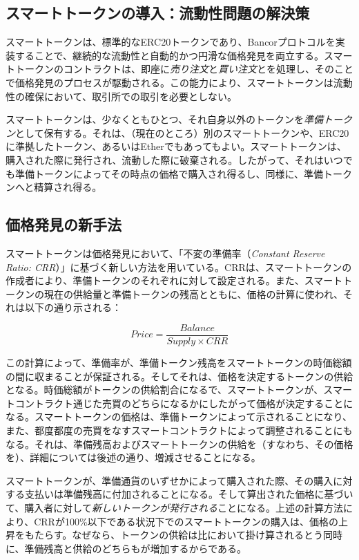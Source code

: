 \documentclass{jsarticle}
\begin{document}
  \subsection{スマートトークンの導入：流動性問題の解決策}

  スマートトークンは、標準的なERC20トークンであり、Bancorプロトコルを実装することで、継続的な流動性と自動的かつ円滑な価格発見を両立する。スマートトークンのコントラクトは、即座に\emph{売り注文}と\emph{買い注文}とを処理し、そのことで価格発見のプロセスが駆動される。この能力により、スマートトークンは流動性の確保において、取引所での取引を必要としない。

  スマートトークンは、少なくともひとつ、それ自身以外のトークンを\emph{準備トークン}として保有する。それは、（現在のところ）別のスマートトークンや、ERC20に準拠したトークン、あるいはEtherでもあってもよい。スマートトークンは、購入された際に発行され、流動した際に破棄される。したがって、それはいつでも準備トークンによってその時点の価格で購入され得るし、同様に、準備トークンへと精算され得る。

  \subsection{価格発見の新手法}

  スマートトークンは価格発見において、「不変の準備率（\textit{Constant Reserve Ratio: CRR}）」に基づく新しい方法を用いている。CRRは、スマートトークンの作成者により、準備トークンのそれぞれに対して設定される。また、スマートトークンの現在の供給量と準備トークンの残高とともに、価格の計算に使われ、それは以下の通り示される：

  \begin{equation*} \label{eq:price-discovery-formula}
    Price = \frac{Balance}{Supply \times CRR}
  \end{equation*}

  この計算によって、準備率が、準備トークン残高をスマートトークンの時価総額の間に収まることが保証される。そしてそれは、価格を決定するトークンの供給となる。時価総額がトークンの供給割合になるで、スマートトークンが、スマートコントラクト通じた売買のどちらになるかにしたがって価格が決定することになる。スマートトークンの価格は、準備トークンによって示されることになり、また、都度都度の売買をなすスマートコントラクトによって調整されることにもなる。それは、準備残高およびスマートトークンの供給を（すなわち、その価格を）、詳細については後述の通り、増減させることになる。

  スマートトークンが、準備通貨のいずせかによって購入された際、その購入に対する支払いは準備残高に付加されることになる。そして算出された価格に基づいて、購入者に対して\emph{新しいトークンが発行される}ことになる。上述の計算方法により、CRRが100\%以下である状況下でのスマートトークンの購入は、価格の上昇をもたらす。なぜなら、トークンの供給は比において掛け算されるとう同時に、準備残高と供給のどちらもが増加するからである。
\end{document}
